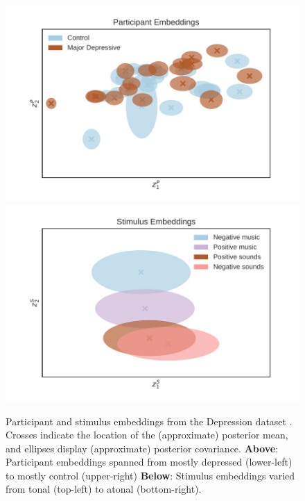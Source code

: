 \documentclass[twoside]{article}
\begin{document}
\begin{figure}[!t]
    \includegraphics[width=\columnwidth]{figures/lepping_2017_noresponse-subject_embedding.pdf}
    \includegraphics[width=\columnwidth]{figures/lepping_2017_noresponse-task_embedding.pdf}
    \caption{Participant and stimulus embeddings from the Depression dataset \citep{10.1371/journal.pone.0156859}.  Crosses indicate the location of the (approximate) posterior mean, and ellipses display (approximate) posterior covariance. \textbf{Above}: Participant embeddings spanned from mostly depressed (lower-left) to mostly control (upper-right) \textbf{Below}: Stimulus embeddings varied from tonal (top-left) to atonal (bottom-right).}
    \label{fig:lepping-embeddings}
    \vspace{-1.5em}
\end{figure}
\end{document}
